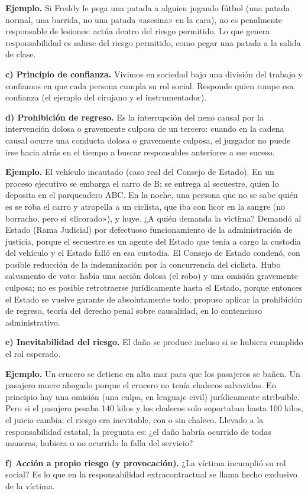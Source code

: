 \begin{ejemplo}
\textcolor[HTML]{4F6228}{\textbf{Ejemplo. }}Si Freddy le pega una patada a alguien jugando fútbol (una patada normal, una barrida, no una patada «asesina» en la cara), no es penalmente responsable de lesiones: actúa dentro del riesgo permitido. Lo que genera responsabilidad es salirse del riesgo permitido, como pegar una patada a la salida de clase.
\end{ejemplo}
\textbf{c) Principio de confianza.} Vivimos en sociedad bajo una división del trabajo y confiamos en que cada persona cumpla su rol social. Responde quien rompe esa confianza (el ejemplo del cirujano y el instrumentador).

\textbf{d) Prohibición de regreso.} Es la interrupción del nexo causal por la intervención dolosa o gravemente culposa de un tercero: cuando en la cadena causal ocurre una conducta dolosa o gravemente culposa, el juzgador no puede irse hacia atrás en el tiempo a buscar responsables anteriores a ese suceso.

\begin{ejemplo}
\textcolor[HTML]{4F6228}{\textbf{Ejemplo. }}El vehículo incautado (caso real del Consejo de Estado). En un proceso ejecutivo se embarga el carro de B; se entrega al secuestre, quien lo deposita en el parqueadero ABC. En la noche, una persona que no se sabe quién es se roba el carro y atropella a un ciclista, que iba con licor en la sangre (no borracho, pero sí «licorado»), y huye. ¿A quién demanda la víctima? Demandó al Estado (Rama Judicial) por defectuoso funcionamiento de la administración de justicia, porque el secuestre es un agente del Estado que tenía a cargo la custodia del vehículo y el Estado falló en esa custodia. El Consejo de Estado condenó, con posible reducción de la indemnización por la concurrencia del ciclista. Hubo salvamento de voto: había una acción dolosa (el robo) y una omisión gravemente culposa; no es posible retrotraerse jurídicamente hasta el Estado, porque entonces el Estado se vuelve garante de absolutamente todo; propuso aplicar la prohibición de regreso, teoría del derecho penal sobre causalidad, en lo contencioso administrativo.
\end{ejemplo}
\textbf{e) Inevitabilidad del riesgo.} El daño se produce incluso si se hubiera cumplido el rol esperado.

\begin{ejemplo}
\textcolor[HTML]{4F6228}{\textbf{Ejemplo. }}Un crucero se detiene en alta mar para que los pasajeros se bañen. Un pasajero muere ahogado porque el crucero no tenía chalecos salvavidas. En principio hay una omisión (una culpa, en lenguaje civil) jurídicamente atribuible. Pero si el pasajero pesaba 140 kilos y los chalecos solo soportaban hasta 100 kilos, el juicio cambia: el riesgo era inevitable, con o sin chaleco. Llevado a la responsabilidad estatal, la pregunta es: ¿el daño habría ocurrido de todas maneras, hubiera o no ocurrido la falla del servicio?
\end{ejemplo}
\textbf{f) Acción a propio riesgo (y provocación).} ¿La víctima incumplió su rol social? Es lo que en la responsabilidad extracontractual se llama hecho exclusivo de la víctima.

